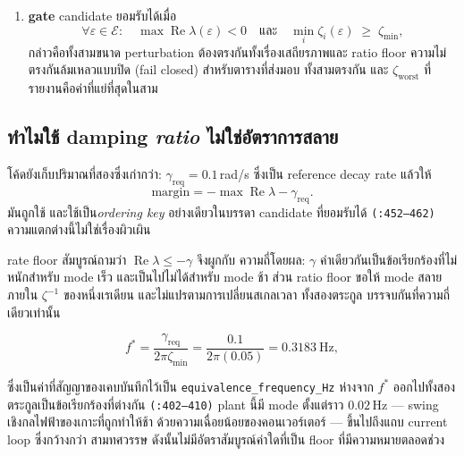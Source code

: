 \documentclass[12pt,a4paper]{article}
\theoremstyle{remark}
\newcommand{\zmin}{\zeta_{\min}}
\newcommand{\zworst}{\zeta_{\mathrm{worst}}}
\newcommand{\greq}{\gamma_{\mathrm{req}}}
\newcommand{\code}[1]{\texttt{\small #1}}
\begin{document}
\begin{enumerate}[leftmargin=1.9em]
      finite-difference step $\varepsilon \in \{1.5,\,3,\,6\}\times10^{-6}$
      (ฐานที่ audit ไว้คูณ $0.5$, $1$, $2$) และทดสอบที่\emph{ทุก}สมาชิก
      \code{(:412--448)}
\item \textbf{gate} candidate ยอมรับได้เมื่อ
      \begin{equation}
      \forall \varepsilon \in \mathcal{E}:\quad
      \max\operatorname{Re}\lambda(\varepsilon) < 0
      \quad\text{และ}\quad
      \min_i \zeta_i(\varepsilon) \;\ge\; \zmin,
      \label{eq:gate}
      \end{equation}
      กล่าวคือทั้งสามขนาด perturbation ต้องตรงกันทั้งเรื่องเสถียรภาพและ
      ratio floor ความไม่ตรงกันล้มเหลวแบบปิด (fail closed) สำหรับตารางที่ส่งมอบ
      ทั้งสามตรงกัน และ $\zworst$ ที่รายงานคือค่าที่แย่ที่สุดในสาม
\end{enumerate}

\subsection{ทำไมใช้ damping \emph{ratio} ไม่ใช่อัตราการสลาย}

โค้ดยังเก็บปริมาณที่สองซึ่งเก่ากว่า: $\greq = 0.1$\,rad/s ซึ่งเป็น reference
decay rate แล้วให้
\begin{equation}
\mathrm{margin} = -\max\operatorname{Re}\lambda - \greq .
\label{eq:margin}
\end{equation}
มันถูกใช้ และใช้เป็น\emph{ordering key} อย่างเดียวในบรรดา candidate ที่ยอมรับได้
\code{(:452--462)} ความแตกต่างนี้ไม่ใช่เรื่องผิวเผิน

rate floor สัมบูรณ์ถามว่า $\operatorname{Re}\lambda \le -\gamma$ จึงผูกกับ
ความถี่โดยผล: $\gamma$ ค่าเดียวกันเป็นข้อเรียกร้องที่ไม่หนักสำหรับ mode เร็ว
และเป็นไปไม่ได้สำหรับ mode ช้า ส่วน ratio floor ขอให้ mode สลายภายใน
$\zeta^{-1}$ ของหนึ่งเรเดียน และไม่แปรตามการเปลี่ยนสเกลเวลา ทั้งสองตระกูล
บรรจบกันที่ความถี่เดียวเท่านั้น

\begin{equation}
f^{*} = \frac{\greq}{2\pi\zmin} = \frac{0.1}{2\pi(0.05)} = 0.3183\ \mathrm{Hz},
\label{eq:fstar}
\end{equation}

ซึ่งเป็นค่าที่สัญญาของเคบบันทึกไว้เป็น \code{equivalence\_frequency\_Hz}
ห่างจาก $f^{*}$ ออกไปทั้งสองตระกูลเป็นข้อเรียกร้องที่ต่างกัน \code{(:402--410)}
plant นี้มี mode ตั้งแต่ราว $0.02$\,Hz --- swing เชิงกลไฟฟ้าของเกาะที่ถูกทำให้ช้า
ด้วยความเฉื่อยน้อยของคอนเวอร์เตอร์ --- ขึ้นไปถึงแถบ current loop ซึ่งกว้างกว่า
สามทศวรรษ ดังนั้นไม่มีอัตราสัมบูรณ์ค่าใดที่เป็น floor ที่มีความหมายตลอดช่วง
\end{document}

